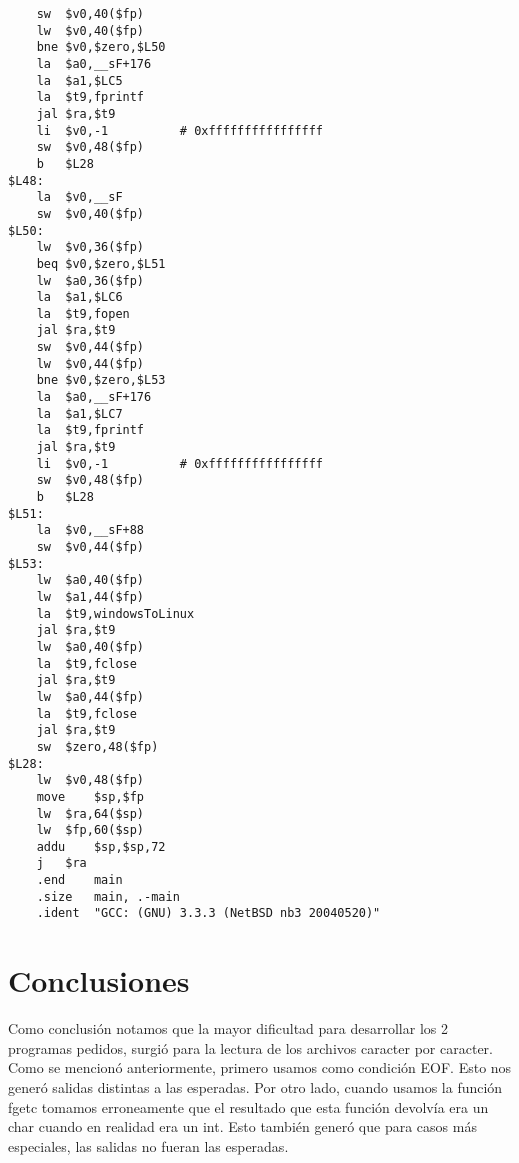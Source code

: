 \documentclass[a4paper,11pt]{article}
\begin{document}
\begin{verbatim}
	sw	$v0,40($fp)
	lw	$v0,40($fp)
	bne	$v0,$zero,$L50
	la	$a0,__sF+176
	la	$a1,$LC5
	la	$t9,fprintf
	jal	$ra,$t9
	li	$v0,-1			# 0xffffffffffffffff
	sw	$v0,48($fp)
	b	$L28
$L48:
	la	$v0,__sF
	sw	$v0,40($fp)
$L50:
	lw	$v0,36($fp)
	beq	$v0,$zero,$L51
	lw	$a0,36($fp)
	la	$a1,$LC6
	la	$t9,fopen
	jal	$ra,$t9
	sw	$v0,44($fp)
	lw	$v0,44($fp)
	bne	$v0,$zero,$L53
	la	$a0,__sF+176
	la	$a1,$LC7
	la	$t9,fprintf
	jal	$ra,$t9
	li	$v0,-1			# 0xffffffffffffffff
	sw	$v0,48($fp)
	b	$L28
$L51:
	la	$v0,__sF+88
	sw	$v0,44($fp)
$L53:
	lw	$a0,40($fp)
	lw	$a1,44($fp)
	la	$t9,windowsToLinux
	jal	$ra,$t9
	lw	$a0,40($fp)
	la	$t9,fclose
	jal	$ra,$t9
	lw	$a0,44($fp)
	la	$t9,fclose
	jal	$ra,$t9
	sw	$zero,48($fp)
$L28:
	lw	$v0,48($fp)
	move	$sp,$fp
	lw	$ra,64($sp)
	lw	$fp,60($sp)
	addu	$sp,$sp,72
	j	$ra
	.end	main
	.size	main, .-main
	.ident	"GCC: (GNU) 3.3.3 (NetBSD nb3 20040520)"
\end{verbatim}

\section{Conclusiones}
Como conclusi\'on notamos que la mayor dificultad para desarrollar los 2 programas pedidos, surgi\'o para la lectura de los archivos caracter por caracter. Como se mencion\'o anteriormente, primero usamos como condici\'on EOF. Esto nos gener\'o salidas distintas a las esperadas. Por otro lado, cuando usamos la funci\'on fgetc tomamos erroneamente que el resultado que esta funci\'on devolv\'ia era un char cuando en realidad era un int. Esto tambi\'en gener\'o que para casos m\'as especiales, las salidas no fueran las esperadas.
\end{document}
